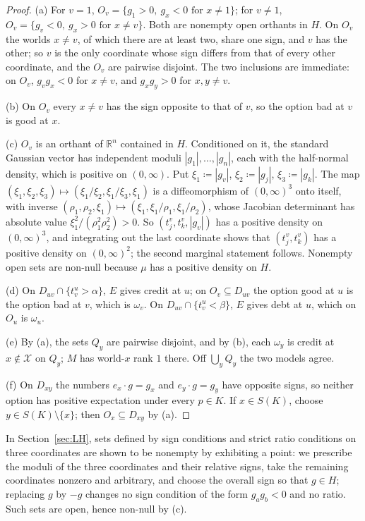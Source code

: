 \documentclass[11pt]{article}
\theoremstyle{definition}\newtheorem{definition}[theorem]{Definition}
\theoremstyle{remark}\newtheorem{remark}[theorem]{Remark}
\newcommand{\R}{\mathbb R}
\begin{document}
\begin{proof}
(a) For $v=1$, $O_v=\{g_1>0,\ g_x<0\text{ for }x\ne1\}$; for $v\ne1$,
$O_v=\{g_v<0,\ g_x>0\text{ for }x\ne v\}$. Both are nonempty open orthants
in $H$. On $O_v$ the worlds $x\ne v$, of which there are at least two,
share one sign, and $v$ has the other; so $v$ is the only coordinate whose
sign differs from that of every other coordinate, and the $O_v$ are
pairwise disjoint. The two inclusions are immediate: on $O_v$, $g_vg_x<0$
for $x\ne v$, and $g_xg_y>0$ for $x,y\ne v$.

(b) On $O_v$ every $x\ne v$ has the sign opposite to that of $v$, so the
option bad at $v$ is good at $x$.

(c) $O_v$ is an orthant of $\R^n$ contained in $H$. Conditioned on it, the
standard Gaussian vector has independent moduli $|g_1|,\dots,|g_n|$, each
with the half-normal density, which is positive on $(0,\infty)$. Put
$\xi_1\coloneqq|g_v|$, $\xi_2\coloneqq|g_j|$, $\xi_3\coloneqq|g_k|$. The map
$(\xi_1,\xi_2,\xi_3)\mapsto(\xi_1/\xi_2,\xi_1/\xi_3,\xi_1)$ is a
diffeomorphism of $(0,\infty)^3$ onto itself, with inverse
$(\rho_1,\rho_2,\xi_1)\mapsto(\xi_1,\xi_1/\rho_1,\xi_1/\rho_2)$, whose
Jacobian determinant has absolute value $\xi_1^2/(\rho_1^2\rho_2^2)>0$. So
$(t^v_j,t^v_k,|g_v|)$ has a positive density on $(0,\infty)^3$, and
integrating out the last coordinate shows that $(t^v_j,t^v_k)$ has a
positive density on $(0,\infty)^2$; the second marginal statement follows.
Nonempty open sets are non-null because $\mu$ has a positive density on
$H$.

(d) On $D_{uv}\cap\{t^u_v>\alpha\}$, $E$ gives credit at $u$; on
$O_v\subseteq D_{uv}$ the option good at $u$ is the option bad at $v$,
which is $\omega_v$. On $D_{uv}\cap\{t^u_v<\beta\}$, $E$ gives debt at $u$,
which on $O_u$ is $\omega_u$.

(e) By (a), the sets $Q_y$ are pairwise disjoint, and by (b), each
$\omega_y$ is credit at $x\notin\mathcal X$ on $Q_y$; $M$ has world-$x$
rank $1$ there. Off $\bigcup_yQ_y$ the two models agree.

(f) On $D_{xy}$ the numbers $e_x\cdot g=g_x$ and $e_y\cdot g=g_y$ have
opposite signs, so neither option has positive expectation under every
$p\in K$. If $x\in S(K)$, choose $y\in S(K)\setminus\{x\}$; then
$O_x\subseteq D_{xy}$ by (a).
\end{proof}

In Section~\ref{sec:LH}, sets defined by sign conditions and strict ratio
conditions on three coordinates are shown to be nonempty by exhibiting a
point: we prescribe the moduli of the three coordinates and their relative
signs, take the remaining coordinates nonzero and arbitrary, and choose the
overall sign so that $g\in H$; replacing $g$ by $-g$ changes no sign
condition of the form $g_ag_b<0$ and no ratio. Such sets are open, hence
non-null by (c).
\end{document}
